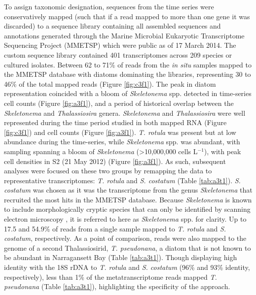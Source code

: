 To assign taxonomic designation, sequences from the time series were conservatively mapped (such that if a read mapped to more than one gene it was discarded) to a sequence library containing all assembled sequences and annotations generated through the Marine Microbial Eukaryotic Transcriptome Sequencing Project (MMETSP) \citep{Keeling2014} which were public as of 17 March 2014. The custom sequence library contained 401 transcriptomes across 209 species or cultured isolates. Between 62 to 71\% of reads from the \textit{in situ} samples mapped to the MMETSP database with diatoms dominating the libraries, representing 30 to 46\% of the total mapped reads (Figure \ref{fig:c3f1}). The peak in diatom representation coincided with a bloom of \textit{Skeletonema} spp. detected in time-series cell counts (Figure \ref{fig:a3f1}), and a period of historical overlap between the \textit{Skeletonema} and \textit{Thalassiosira} genera. \textit{Skeletonema} and \textit{Thalassiosira} were well represented during the time period studied in both mapped RNA (Figure \ref{fig:c3f1}) and cell counts (Figure \ref{fig:a3f1}). \textit{T. rotula} was present but at low abundance during the time-series, while \textit{Skeletonema} spp. was abundant, with sampling spanning a bloom of \textit{Skeletonema} (>10,000,000 cells L$^{-1}$), with peak cell densities in S2 (21 May 2012) (Figure \ref{fig:a3f1}). As such, subsequent analyses were focused on these two groups by remapping the data to representative transcriptomes: \textit{T. rotula} and \textit{S. costatum} (Table \ref{tab:a3t1}). \textit{S. costatum} was chosen as it was the transcriptome from the genus \textit{Skeletonema} that recruited the most hits in the MMETSP database. Because \textit{Skeletonema} is known to include morphologically cryptic species that can only be identified by scanning electron microscopy \citep{Sarno2005, Zingone2005, Smayda2011}, it is referred to here as \textit{Skeletonema} spp. for clarity. Up to 17.5 and 54.9\% of reads from a single sample mapped to \textit{T. rotula} and \textit{S. costatum}, respectively. As a point of comparison, reads were also mapped to the genome of a second Thalassiosirid, \textit{T. pseudonana}, a diatom that is not known to be abundant in Narragansett Bay (Table \ref{tab:a3t1}). Though displaying high identity with the 18S rDNA to \textit{T. rotula} and \textit{S. costatum} (96\% and 93\% identity, respectively), less than 1\% of the metatranscriptome reads mapped \textit{T. pseudonana} (Table \ref{tab:a3t1}), highlighting the specificity of the approach. 

